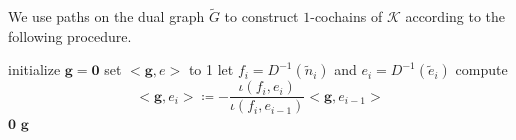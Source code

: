 \documentclass[a4paper,twoside,10pt]{article}
\theoremstyle{plain}
\theoremstyle{definition}
\theoremstyle{remark}
\newcommand{\mc}{\mathcal}
\newcommand{\K}{\mc{K}}
\newcommand{\inner}[2]{< #1,#2>}
\newcommand{\cochain}[1]{\mathbf #1}
\newcommand{\dual}[1]{\tilde{#1}}
\begin{document}
We use paths on the dual graph $\dual G$ to construct $1$-cochains of $\K$ according to the following procedure.
\begin{algorithm}[H]
\caption{Construct a $1$-cocycle $\cochain{g}$ on $\K$ from a path 
$\dual p$ and a pair of edges $(e,e')$ with $e\subset f_1$ and $e'\subset f_l$}
\begin{algorithmic}[1]
    \State initialize $\cochain g = \cochain 0$
    \State set $\inner{\cochain g}{e}$ to 1
        \State let $f_i = D^{-1}(\dual n_i)$ and $e_i = D^{-1}(\dual e_i)$ 
        \State compute
        \[   
     \inner{\cochain g}{e_i}
        \coloneqq 
        -\frac{\iota(f_i, e_i)}{\iota(f_i, e_{i-1})}
        \inner{\cochain g}{e_{i-1}}
        \]
    \EndFor
    \If {$\inner{\cochain g}{e'} = 0$}
        \State \Return $\cochain 0$
    \Else
        \State \Return $\cochain g$
   
  \EndIf
\end{algorithmic}
\label{alg:cocycle}
\end{algorithm}
\end{document}
